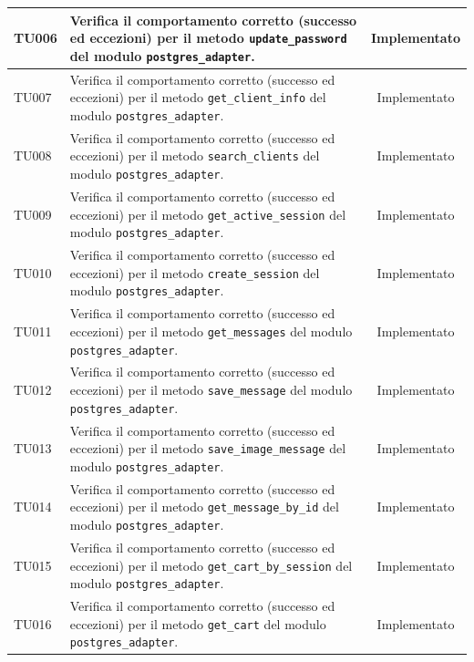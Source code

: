 \documentclass[a4paper,11pt,oneside]{scrartcl}
\begin{document}
\begin{longtable}{|p{1.9cm}|p{11.6cm}|c|}
    TU006           & Verifica il comportamento corretto (successo ed eccezioni) per il metodo \texttt{update\_password} del modulo \texttt{postgres\_adapter}.                    & Implementato   \\ \hline
    TU007           & Verifica il comportamento corretto (successo ed eccezioni) per il metodo \texttt{get\_client\_info} del modulo \texttt{postgres\_adapter}.                   & Implementato   \\ \hline
    TU008           & Verifica il comportamento corretto (successo ed eccezioni) per il metodo \texttt{search\_clients} del modulo \texttt{postgres\_adapter}.                     & Implementato   \\ \hline
    TU009           & Verifica il comportamento corretto (successo ed eccezioni) per il metodo \texttt{get\_active\_session} del modulo \texttt{postgres\_adapter}.                & Implementato   \\ \hline
    TU010           & Verifica il comportamento corretto (successo ed eccezioni) per il metodo \texttt{create\_session} del modulo \texttt{postgres\_adapter}.                     & Implementato   \\ \hline
    TU011           & Verifica il comportamento corretto (successo ed eccezioni) per il metodo \texttt{get\_messages} del modulo \texttt{postgres\_adapter}.                       & Implementato   \\ \hline
    TU012           & Verifica il comportamento corretto (successo ed eccezioni) per il metodo \texttt{save\_message} del modulo \texttt{postgres\_adapter}.                       & Implementato   \\ \hline
    TU013           & Verifica il comportamento corretto (successo ed eccezioni) per il metodo \texttt{save\_image\_message} del modulo \texttt{postgres\_adapter}.                & Implementato   \\ \hline
    TU014           & Verifica il comportamento corretto (successo ed eccezioni) per il metodo \texttt{get\_message\_by\_id} del modulo \texttt{postgres\_adapter}.                & Implementato   \\ \hline
    TU015           & Verifica il comportamento corretto (successo ed eccezioni) per il metodo \texttt{get\_cart\_by\_session} del modulo \texttt{postgres\_adapter}.              & Implementato   \\ \hline
    TU016           & Verifica il comportamento corretto (successo ed eccezioni) per il metodo \texttt{get\_cart} del modulo \texttt{postgres\_adapter}.                           & Implementato   \\ \hline

\end{longtable}
\end{document}
